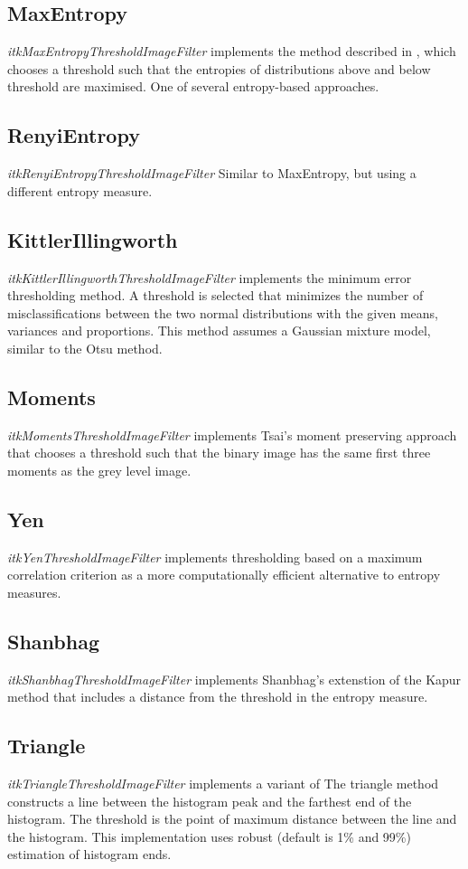\documentclass{InsightArticle}
\begin{document}
\subsection{MaxEntropy}
 {\em itkMaxEntropyThresholdImageFilter} implements the method
 described in \cite{kapur1985new}, which chooses a threshold such that the entropies of distributions above and
below threshold are maximised. One of several entropy-based approaches.
\subsection{RenyiEntropy}
{\em itkRenyiEntropyThresholdImageFilter} Similar to MaxEntropy, but using a different entropy measure\cite{kapur1985new}.

\subsection{KittlerIllingworth}
 {\em itkKittlerIllingworthThresholdImageFilter} implements the minimum
error thresholding method\cite{kittler1986minimum}. A threshold is
selected that minimizes the number of misclassifications between the
two normal distributions with the given means, variances and
proportions. This method assumes a Gaussian mixture model, similar to
the Otsu method.
\subsection{Moments}
{\em itkMomentsThresholdImageFilter} implements Tsai's moment
preserving approach \cite{tsai1985moment} that chooses a threshold such that the binary image has the same first three moments as the grey level image.
\subsection{Yen}
{\em itkYenThresholdImageFilter} implements thresholding based on a
maximum correlation criterion \cite{yen1995new} as a more
computationally efficient alternative to entropy measures.

\subsection{Shanbhag}
 {\em itkShanbhagThresholdImageFilter} implements Shanbhag's
 extenstion of the Kapur method\cite{shanbhag1994utilization} that
 includes a distance from the threshold in the entropy measure.

\subsection{Triangle}
{\em itkTriangleThresholdImageFilter} implements a variant of \cite{zack1977automatic}
The triangle method constructs a line between the histogram peak and
the farthest end of the histogram. The threshold is the point of
maximum distance between the line and the histogram. This
implementation uses robust (default is 1\% and 99\%) estimation of histogram ends.
\end{document}
